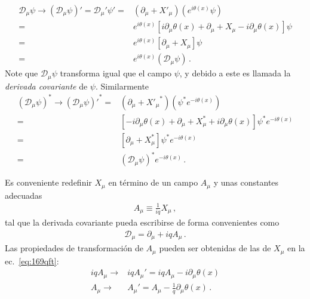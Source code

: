 \begin{subappendices}
\begin{align}
    \mathcal{D}_\mu \psi\to\left(\mathcal{D}_\mu \psi\right)'=\mathcal{D}_\mu' \psi'=&(\partial_\mu+X'_\mu) \left(e^{i\theta(x)}\psi\right)\nonumber\\
=&e^{i\theta(x)}\left[i\partial_\mu \theta(x)+\partial_\mu+X_\mu-i\partial_\mu\theta(x) \right]\psi\nonumber\\
=&e^{i\theta(x)}\left[\partial_\mu+X_\mu\right]\psi\nonumber\\
=&e^{i\theta(x)}\left(\mathcal{D}_\mu\psi\right)\,.
\end{align}
Note que  $\mathcal{D}_\mu\psi$ transforma igual que el campo $\psi$, y debido a este es llamada la \emph{derivada covariante} de $\psi$.
Similarmente
\begin{align}
    (\mathcal{D}_\mu \psi)^*\to{\left(\mathcal{D}_\mu \psi\right)'}^*=&(\partial_\mu+{X'_\mu}^*) \left(\psi^*e^{-i\theta(x)}\right)\nonumber\\
=&\left[-i\partial_\mu \theta(x)+\partial_\mu+X_\mu^*+i\partial_\mu\theta(x) \right]\psi^*e^{-i\theta(x)}\nonumber\\
=&\left[\partial_\mu+X_\mu^*\right]\psi^*e^{-i\theta(x)}\nonumber\\
=&\left(\mathcal{D}_\mu\psi\right)^*e^{-i\theta(x)}\,.
\end{align}

Es conveniente redefinir $X_\mu$ en término de un campo  $A_\mu$ y unas constantes adecuadas
\begin{align}
  A_\mu\equiv\frac{1}{i q}X_\mu\,,
\end{align}
tal que la derivada covariante pueda escribirse de forma convenientes como
\begin{align}
\label{eq:170qft}
  \mathcal{D}_\mu=\partial_\mu+i q A_\mu\,.
\end{align}
Las propiedades de transformación de  $A_\mu$ pueden ser obtenidas de las de  $X_\mu$ en la ec.~\eqref{eq:169qft}: 
\begin{align}
\label{eq:159qft}
 i q A_\mu\to& i q A_\mu'=i q A_\mu-i \partial_\mu\theta(x)\nonumber\\
  A_\mu\to&  A_\mu'= A_\mu-\frac{1}{q} \partial_\mu\theta(x)\,.
\end{align}


\end{subappendices}
